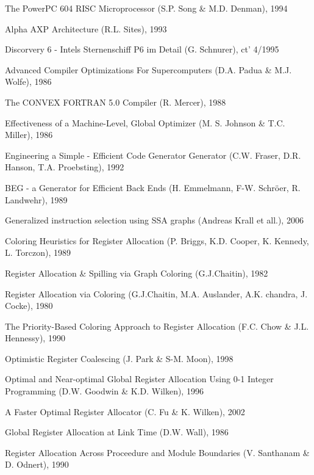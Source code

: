 \documentclass[a4paper,10pt]{article}
\begin{document}
\newpage
\begin{thebibliography}{9}
\footnotesize
{}
The PowerPC 604 RISC Microprocessor (S.P. Song \& M.D. Denman), 1994

Alpha AXP Architecture (R.L. Sites), 1993

Discorvery 6 - Intels Sternenschiff P6 im Detail (G. Schnurer), ct' 4/1995

Advanced Compiler Optimizations For Supercomputers (D.A. Padua \& M.J. Wolfe), 1986

The CONVEX FORTRAN 5.0 Compiler (R. Mercer), 1988

Effectiveness of a Machine-Level, Global Optimizer (M. S. Johnson \& T.C. Miller), 1986

Engineering a Simple - Efficient Code Generator Generator (C.W. Fraser, D.R. Hanson, T.A. Proebsting), 1992

BEG - a Generator for Efficient Back Ends (H. Emmelmann, F-W. Schr\"oer, R. Landwehr), 1989

Generalized instruction selection using SSA graphs (Andreas Krall et all.), 2006

Coloring Heuristics for Register Allocation (P. Briggs, K.D. Cooper, K. Kennedy, L. Torczon), 1989

Register Allocation \& Spilling via Graph Coloring (G.J.Chaitin), 1982

Register Allocation via Coloring (G.J.Chaitin, M.A. Auslander, A.K. chandra, J. Cocke), 1980

The Priority-Based Coloring Approach to Register Allocation (F.C. Chow \& J.L. Hennessy), 1990

Optimistic Register Coalescing (J. Park \& S-M. Moon), 1998

Optimal and Near-optimal Global Register Allocation Using 0-1 Integer Programming (D.W. Goodwin \& K.D. Wilken), 1996

A Faster Optimal Register Allocator (C. Fu \& K. Wilken), 2002

Global Register Allocation at Link Time (D.W. Wall), 1986

Register Allocation Across Proceedure and Module Boundaries (V. Santhanam \& D. Odnert), 1990


\end{thebibliography}
\end{document}
